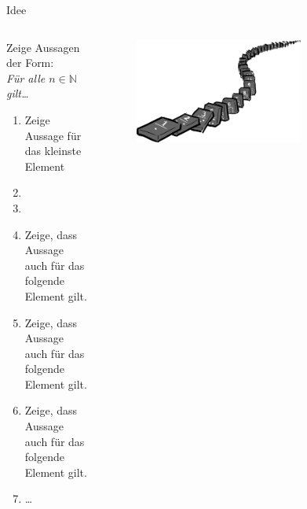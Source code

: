 %
%
%
%

\begin{frame}[fragile]{Idee}
    \begin{columns}
        \begin{alertblock}{Zeige Aussagen der Form:\\\emph{Für alle $n\in\mathbb{N}$ gilt\ldots}}
            \begin{enumerate}
                \item Zeige Aussage für das kleinste Element
                \item<1-> 
                \item<2-6,8> 
                \item<3-6> \footnotesize Zeige, dass Aussage auch für das folgende Element gilt.
                \item<4-6> \scriptsize Zeige, dass Aussage auch für das folgende Element gilt.
                \item<5-6> \tiny Zeige, dass Aussage auch für das folgende Element gilt.
                \item<6> \dots
            \end{enumerate}
        \end{alertblock}
        \begin{figure}
            \centering
            \includegraphics[width=0.7\textwidth]{../figures/induction.png}
        \end{figure}
    \end{columns}
\end{frame}

